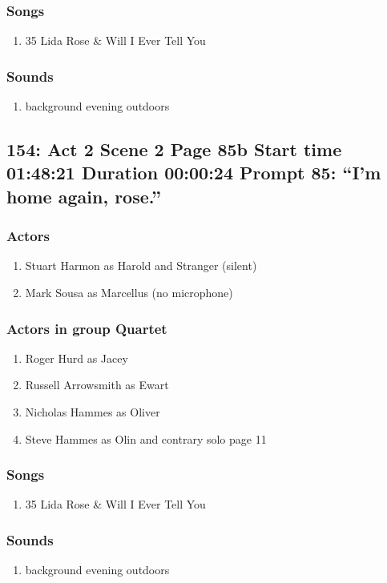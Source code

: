 \subsubsection{Songs}
\begin{enumerate}
\item 35 Lida Rose \& Will I Ever Tell You
\end{enumerate}\subsubsection{Sounds}
\begin{enumerate}
\item background evening outdoors
\end{enumerate}
\subsection{154: Act 2 Scene 2 Page 85b Start time 01:48:21 Duration 00:00:24 Prompt 85: ``I'm home again, rose.''}

\subsubsection{Actors}
\begin{enumerate}
\item Stuart Harmon as Harold and Stranger (silent)
\item Mark Sousa as Marcellus (no microphone)
\end{enumerate}
\subsubsection{Actors in group Quartet}
\begin{enumerate}
\item Roger Hurd as Jacey
\item Russell Arrowsmith as Ewart
\item Nicholas Hammes as Oliver
\item Steve Hammes as Olin and contrary solo page 11
\end{enumerate}

\subsubsection{Songs}
\begin{enumerate}
\item 35 Lida Rose \& Will I Ever Tell You
\end{enumerate}\subsubsection{Sounds}
\begin{enumerate}
\item background evening outdoors
\end{enumerate}
